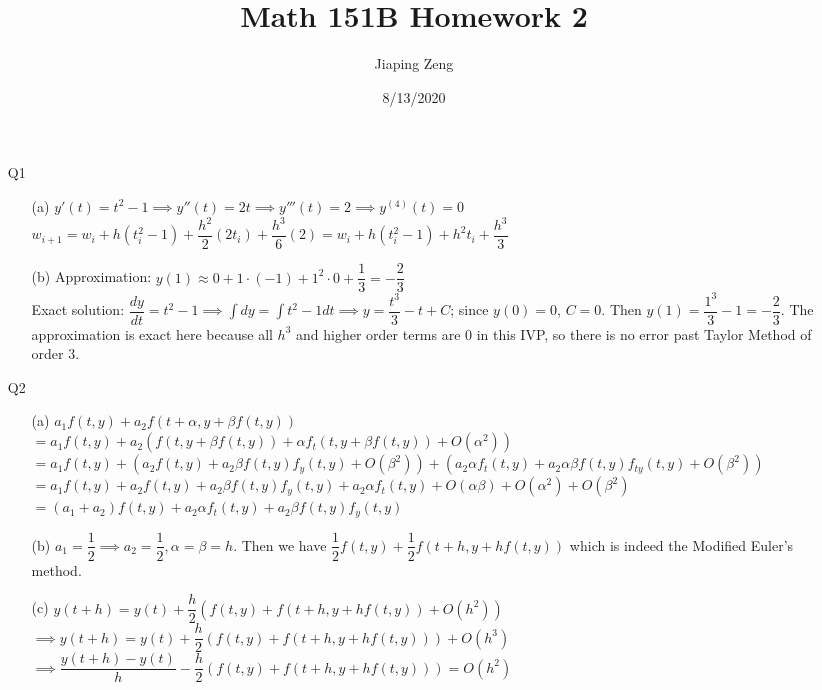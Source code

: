 \documentclass{article}
\title{Math 151B Homework 2}
\date{8/13/2020}
\author{Jiaping Zeng}
\begin{document}
\maketitle

\begin{itemize}
    \item [Q1]
          \begin{itemize}
              \item [(a)] $y'(t)=t^2-1 \implies y''(t)=2t \implies y'''(t)=2 \implies y^{(4)}(t)=0$\\$w_{i+1}=w_i+h(t_i^2-1)+\dfrac{h^2}{2}(2t_i)+\dfrac{h^3}{6}(2)=\boxed{w_i+h(t_i^2-1)+h^2t_i+\dfrac{h^3}{3}}$
              \item [(b)] Approximation: $y(1)\approx 0+1\cdot(-1)+1^2\cdot 0+\dfrac{1}{3}=\boxed{-\dfrac{2}{3}}$\\ Exact solution: $\dfrac{dy}{dt}=t^2-1\implies \int dy=\int t^2-1dt\implies y=\dfrac{t^3}{3}-t+C$; since $y(0)=0$, $C=0$. Then $y(1)=\dfrac{1^3}{3}-1=-\dfrac{2}{3}$. The approximation is exact here because all $h^3$ and higher order terms are 0 in this IVP, so there is no error past Taylor Method of order 3.
          \end{itemize}
    \item [Q2]
          \begin{itemize}
              \item [(a)] $a_1f(t,y)+a_2f(t+\alpha, y+\beta f(t,y))$\\$=a_1f(t,y)+a_2(f(t,y+\beta f(t,y))+\alpha f_t(t,y+\beta f(t,y))+O(\alpha^2))$\\$=a_1f(t,y)+(a_2f(t,y)+a_2\beta f(t,y)f_y(t,y)+O(\beta^2))+(a_2\alpha f_t(t,y)+a_2\alpha\beta f(t,y)f_{ty}(t,y)+O(\beta^2))$\\$=a_1f(t,y)+a_2f(t,y)+a_2\beta f(t,y)f_y(t,y)+a_2\alpha f_t(t,y)+O(\alpha\beta)+O(\alpha^2)+O(\beta^2)$\\$=(a_1+a_2)f(t,y)+a_2\alpha f_t(t,y)+a_2\beta f(t,y)f_y(t,y)$
              \item [(b)] $a_1=\dfrac{1}{2}\implies a_2=\dfrac{1}{2},\alpha=\beta=h$. Then we have $\dfrac{1}{2}f(t,y)+\dfrac{1}{2}f(t+h,y+hf(t,y))$ which is indeed the Modified Euler's method.
              \item [(c)] $y(t+h)=y(t)+\dfrac{h}{2}(f(t,y)+f(t+h,y+hf(t,y))+O(h^2))$\\$\implies y(t+h)=y(t)+\dfrac{h}{2}(f(t,y)+f(t+h,y+hf(t,y)))+O(h^3)$\\$\implies\dfrac{y(t+h)-y(t)}{h}-\dfrac{h}{2}(f(t,y)+f(t+h,y+hf(t,y)))=O(h^2)$

\end{itemize}
\end{itemize}
\end{document}

